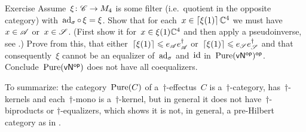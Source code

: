 \documentclass[b]{subfiles}
\begin{document}
\begin{parsec}
\begin{point}{Exercise}
Assume~$\xi \colon \mathscr{C} \to M_4$
    is some filter (i.e.~quotient in the opposite category)
    with~$\mathrm{ad}_\sigma \mathop{\circ} \xi = \xi$.
Show that for each~$x \in \left\lceil\xi(1)\right\rceil \mathbb{C}^4$
    we must have~$x \in \mathscr{A}$ or~$x \in \mathscr{S}$.
    (First show it for~$x \in \xi(1) \mathbb{C}^4$
    and then apply a pseudoinverse, see .)
Prove from this, that either~$\left\lceil\xi(1)\right\rceil \leqslant e_{\mathscr{A}}e^\dagger_{\mathscr{A}} $
    or~$\left\lceil\xi(1)\right\rceil \leqslant e_{\mathscr{S}}e^\dagger_{\mathscr{S}} $
        and that
        consequently~$\xi$ cannot be an equalizer of~$\mathrm{ad}_\sigma$ and~$\operatorname{id}$
    in~${\operatorname{Pure}({\mathsf{vN}}{^{\mathsf{op}}})}{^{\mathsf{op}}}$.
Conclude~$\operatorname{Pure}({\mathsf{vN}}{^{\mathsf{op}}})$ does not have all coequalizers.
\end{point}
\begin{point}%
To summarize:
    the category~$\operatorname{Pure}(C)$
    of a~$\dagger$-effectus~$C$
    is a~$\dagger$-category,
    has~$\dagger$-kernels
    and each~$\dagger$-mono is a~$\dagger$-kernel,
    but in general it does not have~$\dagger$-biproducts or
        $\dagger$-equalizers,
        which shows it is not, in general,
        a pre-Hilbert category as in \cite[3.7.1]{heunenphd}.
\end{point}
\end{parsec}
\end{document}
